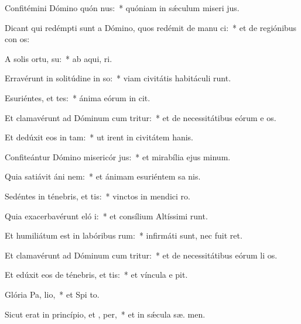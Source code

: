 \item Confitémini Dómino quón nus:~* quóniam in sǽculum miseri jus.
\item Dicant qui redémpti sunt a Dómino, quos redémit de manu ci:~* et de regiónibus con os:
\item A solis ortu,  su:~* ab aqui,  ri.
\item Erravérunt in solitúdine in so:~* viam civitátis habitáculi  runt.
\item Esuriéntes, et tes:~* ánima eórum in  cit.
\item Et clamavérunt ad Dóminum cum tritur:~* et de necessitátibus eórum e os.
\item Et dedúxit eos in  tam:~* ut irent in civitátem hanis.
\item Confiteántur Dómino misericór jus:~* et mirabília ejus  minum.
\item Quia satiávit áni nem:~* et ánimam esuriéntem sa nis.
\item Sedéntes in ténebris, et  tis:~* vinctos in mendici  ro.
\item Quia exacerbavérunt eló i:~* et consílium Altíssimi runt.
\item Et humiliátum est in labóribus  rum:~* infirmáti sunt, nec fuit  ret.
\item Et clamavérunt ad Dóminum cum tritur:~* et de necessitátibus eórum li os.
\item Et edúxit eos de ténebris, et  tis:~* et víncula e pit.
\item Glória Pa,  lio,~* et Spi to.
\item Sicut erat in princípio, et ,  per,~* et in sǽcula sæ. men.
